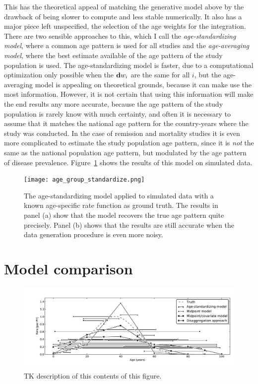 This has the theoretical appeal of matching the generative model above
by the drawback of being slower to compute and less stable
numerically.  It also has a major piece left unspecified, the
selection of the age weights for the integration.  There are two
sensible approaches to this, which I call the \emph{age-standardizing
  model}, where a common age pattern is used for all studies and the
\emph{age-averaging model}, where the best estimate available of the
age pattern of the study population is used.  The age-standardizing
model is faster, due to a computational optimization only possible
when the $\mathbf{d} w_i$ are the same for all $i$, but the age-averaging
model is appealing on theoretical grounds, because it can make use the most
information.  However, it is not certain that using this
information will make the end results any more accurate, because the
age pattern of the study population is rarely know with much
certainty, and often it is necessary to assume that it matches the
national age pattern for the country-years where the study was
conducted.  In the case of remission and mortality studies it is even
more complicated to estimate the study population age pattern, since
it is \emph{not} the same as the national population age pattern, but
modulated by the age pattern of disease prevalence.
Figure~\ref{age-group-standardize} shows the results of this model on
simulated data.

\begin{figure}[h]
\begin{center}
\texttt{[image: age\_group\_standardize.png]}
\caption{The age-standardizing model applied to simulated data with a
  known age-specific rate function as ground truth.  The results in
  panel (a) show that the model 
  recovers the true age pattern quite precisely. Panel (b) shows that the
  results are still accurate when the data generation procedure is
  even more noisy.}
\label{age-group-standardize}
\end{center}
\end{figure}


\section{Model comparison}


\begin{figure}[h]
\begin{center}
\includegraphics[width=\textwidth]{age_group_models.pdf}
\caption{TK description of this contents of this figure.  }
\label{age-group-model-comparison}
\end{center}
\end{figure}


